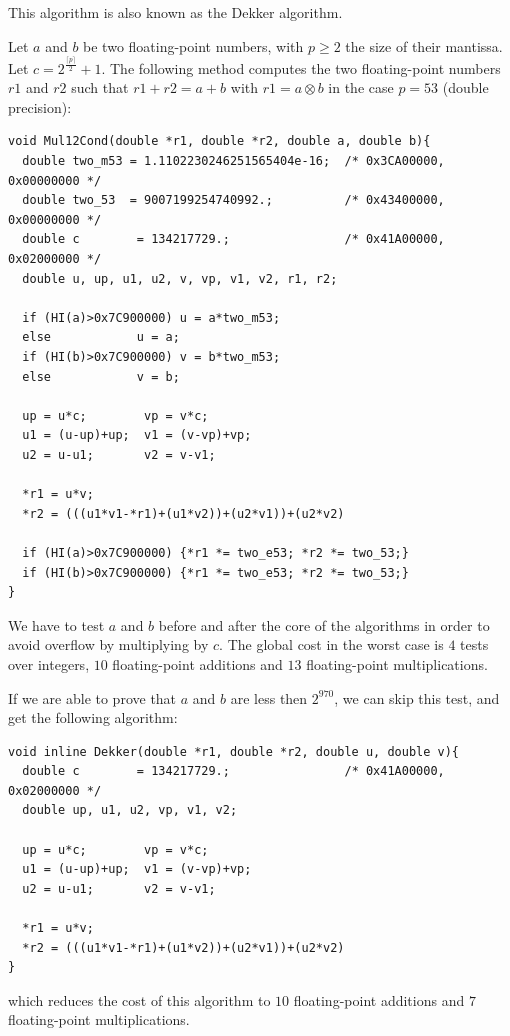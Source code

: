 This algorithm is also known as the Dekker algorithm.

\begin{theorem}
  Let $a$ and $b$ be two floating-point numbers, with $p \geq 2$ the
  size of their mantissa. Let $c=2^{\frac{\lceil p \rceil}{2}}+1$. The
  following method computes the two floating-point numbers $r1$ and
  $r2$ such that $r1 + r2 = a + b$ with $r1 = a \otimes b$ in the case
  $p=53$ (double precision):


\begin{lstlisting}[label={lst:Mul12Cond},caption={Mul12Cond},firstnumber=1]
void Mul12Cond(double *r1, double *r2, double a, double b){
  double two_m53 = 1.1102230246251565404e-16;  /* 0x3CA00000, 0x00000000 */
  double two_53  = 9007199254740992.;          /* 0x43400000, 0x00000000 */
  double c        = 134217729.;                /* 0x41A00000, 0x02000000 */ 
  double u, up, u1, u2, v, vp, v1, v2, r1, r2;

  if (HI(a)>0x7C900000) u = a*two_m53; 
  else            u = a;
  if (HI(b)>0x7C900000) v = b*two_m53; 
  else            v = b;

  up = u*c;        vp = v*c;
  u1 = (u-up)+up;  v1 = (v-vp)+vp;
  u2 = u-u1;       v2 = v-v1;
  
  *r1 = u*v;
  *r2 = (((u1*v1-*r1)+(u1*v2))+(u2*v1))+(u2*v2)

  if (HI(a)>0x7C900000) {*r1 *= two_e53; *r2 *= two_53;} 
  if (HI(b)>0x7C900000) {*r1 *= two_e53; *r2 *= two_53;} 
} 
\end{lstlisting}

We have to test $a$ and $b$ before and after the core of the
algorithms in order to avoid overflow by multiplying by $c$. The
global cost in the worst case is $4$ tests over integers, $10$
floating-point additions and $13$ floating-point multiplications.
\end{theorem}

If we are able to prove that $a$ and $b$ are less then $2^{970}$, we can skip
this test, and get the following algorithm:
\begin{lstlisting}[label={lst:Mul12},caption={Mul12},firstnumber=1]
void inline Dekker(double *r1, double *r2, double u, double v){
  double c        = 134217729.;                /* 0x41A00000, 0x02000000 */ 
  double up, u1, u2, vp, v1, v2;

  up = u*c;        vp = v*c;
  u1 = (u-up)+up;  v1 = (v-vp)+vp;
  u2 = u-u1;       v2 = v-v1;
  
  *r1 = u*v;
  *r2 = (((u1*v1-*r1)+(u1*v2))+(u2*v1))+(u2*v2)
}
\end{lstlisting}
which reduces the cost of this algorithm to $10$ floating-point
additions and $7$ floating-point multiplications.


